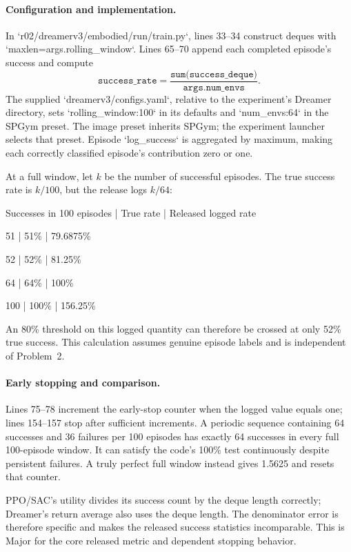 \documentclass[10pt]{article}
\begin{document}
\paragraph*{Configuration and implementation.}\mbox{}\par
In `r02/dreamerv3/embodied/run/train.py`, lines 33–34 construct deques with `maxlen=args.rolling\_window`. Lines 65–70 append each completed episode’s success and compute \[\texttt{success\_rate}
 =\frac{\texttt{sum(success\_deque)}}{\texttt{args.num\_envs}}.\] The supplied `dreamerv3/configs.yaml`, relative to the experiment’s Dreamer directory, sets `rolling\_window:100` in its defaults and `num\_envs:64` in the SPGym preset. The image preset inherits SPGym; the experiment launcher selects that preset. Episode `log\_success` is aggregated by maximum, making each correctly classified episode’s contribution zero or one.\par
At a full window, let \(k\) be the number of successful episodes. The true success rate is \(k/100\), but the release logs \(k/64\):\par
Successes in 100 episodes | True rate | Released logged rate\par
51 | 51\% | 79.6875\%\par
52 | 52\% | 81.25\%\par
64 | 64\% | 100\%\par
100 | 100\% | 156.25\%\par
An 80\% threshold on this logged quantity can therefore be crossed at only 52\% true success. This calculation assumes genuine episode labels and is independent of Problem 2.\par
\paragraph*{Early stopping and comparison.}\mbox{}\par
Lines 75–78 increment the early-stop counter when the logged value equals one; lines 154–157 stop after sufficient increments. A periodic sequence containing 64 successes and 36 failures per 100 episodes has exactly 64 successes in every full 100-episode window. It can satisfy the code’s 100\% test continuously despite persistent failures. A truly perfect full window instead gives 1.5625 and resets that counter.\par
PPO/SAC’s utility divides its success count by the deque length correctly; Dreamer’s return average also uses the deque length. The denominator error is therefore specific and makes the released success statistics incomparable. This is Major for the core released metric and dependent stopping behavior.\par
\end{document}
